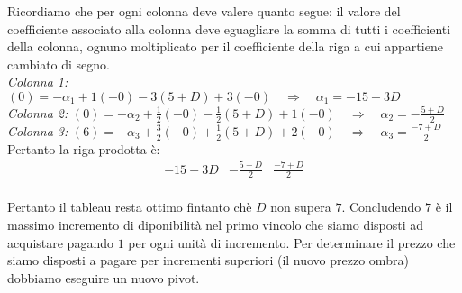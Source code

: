 \documentclass[10pt]{article}
\begin{document}
  Ricordiamo che per ogni colonna deve valere quanto segue: il valore del coefficiente associato alla colonna deve eguagliare la somma di tutti i coefficienti della colonna, ognuno moltiplicato per il coefficiente della riga a cui appartiene cambiato di segno. \\

  \noindent
  {\em Colonna 1:} $(0)=-\alpha_1+1(-0)-3(5+D)+3(-0) \quad \Longrightarrow \quad \alpha_1 = -15-3D$\\
  {\em Colonna 2:} $(0)=-\alpha_2+\frac{1}{2}(-0)-\frac{1}{2}(5+D)+1(-0) \quad \Longrightarrow \quad \alpha_2 = -\frac{5+D}{2}$\\
  {\em Colonna 3:} $(6)=-\alpha_3+\frac{3}{2}(-0)+\frac{1}{2}(5+D)+2(-0) \quad \Longrightarrow \quad \alpha_3 = \frac{-7+D}{2}$\\

Pertanto la riga prodotta \`e:
\[
   \begin{array}{lll}
      -15-3D & -\frac{5+D}{2} & \frac{-7+D}{2} \\
   \end{array}
\]

Pertanto il tableau resta ottimo fintanto ch\`e
$D$ non supera $7$.
Concludendo $7$ \`e il massimo incremento di diponibilit\`a
nel primo vincolo che siamo disposti ad acquistare
pagando $1$ per ogni unit\`a di incremento.
Per determinare il prezzo 
che siamo disposti a pagare per incrementi superiori
(il nuovo prezzo ombra)
dobbiamo eseguire un nuovo pivot.
\end{document}
